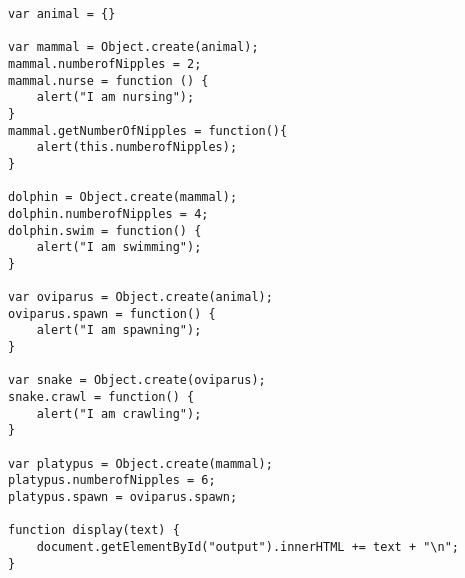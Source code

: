 \begin{verbatim}
var animal = {}

var mammal = Object.create(animal);
mammal.numberofNipples = 2;
mammal.nurse = function () {
	alert("I am nursing");
}
mammal.getNumberOfNipples = function(){
	alert(this.numberofNipples);
}

dolphin = Object.create(mammal);
dolphin.numberofNipples = 4;
dolphin.swim = function() {
	alert("I am swimming");
}

var oviparus = Object.create(animal);
oviparus.spawn = function() {
	alert("I am spawning");
}

var snake = Object.create(oviparus);
snake.crawl = function() {
	alert("I am crawling");
}

var platypus = Object.create(mammal);
platypus.numberofNipples = 6;
platypus.spawn = oviparus.spawn;

function display(text) {
	document.getElementById("output").innerHTML += text + "\n";
}
\end{verbatim}

